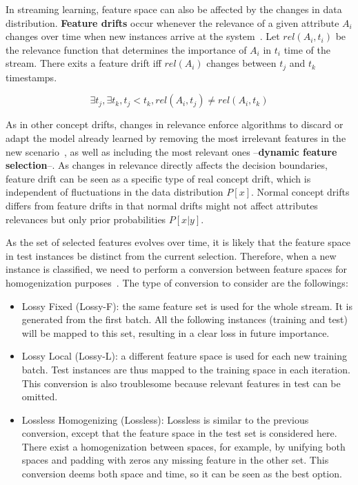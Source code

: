 \documentclass[preprint,12pt]{elsarticle}
\begin{document}
In streaming learning, feature space can also be affected by the changes in data distribution. \textbf{Feature drifts} occur whenever the relevance of a given attribute $A_i$ changes over time when new instances arrive at the system~\cite{barddal15}. Let $rel(A_i, t_i)$ be the relevance function that determines the importance of $A_i$ in $t_i$ time of the stream. There exits a feature drift iff $rel(A_i)$ changes between $t_j$ and $t_k$ timestamps.

\begin{equation}\label{eq:rel}
\exists t_j, \exists t_k, t_j < t_k, rel(A_i, t_j) \neq rel(A_i, t_k)
\end{equation}

As in other concept drifts, changes in relevance enforce algorithms to discard or adapt the model already learned by removing the most irrelevant features in the new scenario~\cite{nguyen12}, as well as including the most relevant ones --\textbf{dynamic feature selection}--. As changes in relevance directly affects the decision boundaries, feature drift can be seen as a specific type of real concept drift, which is independent of fluctuations in the data distribution $P[x]$. Normal concept drifts differs from feature drifts in that normal drifts might not affect attributes relevances but only prior probabilities $P[x|y]$.

As the set of selected features evolves over time, it is likely that the feature space in test instances be distinct from the current selection. Therefore, when a new instance is classified, we need to perform a conversion between feature spaces for homogenization purposes~\cite{masud10}. The type of conversion to consider are the followings: 
\begin{itemize}
	\item Lossy Fixed (Lossy-F): the same feature set is used for the whole stream. It is generated from the first batch. All the following instances (training and test) will be mapped to this set, resulting in a clear loss in future importance.
	\item Lossy Local (Lossy-L): a different feature space is used for each new training batch. Test instances are thus mapped to the training space in each iteration. This conversion is also troublesome because relevant features in test can be omitted.
	\item Lossless Homogenizing (Lossless): Lossless is similar to the previous conversion, except that the feature space in the test set is considered here. There exist a homogenization between spaces, for example, by unifying both spaces and padding with zeros any missing feature in the other set. This conversion deems both space and time, so it can be seen as the best option.
\end{itemize}
\end{document}

